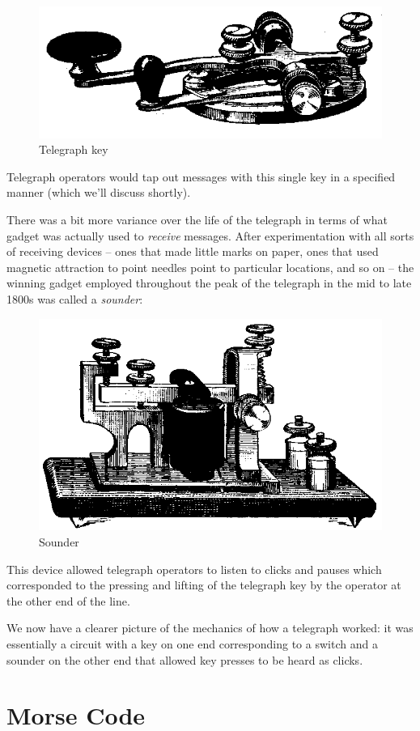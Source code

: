 \documentclass[UTF8]{book}
\begin{document}
\begin{CJK}{UTF8}{gbsn}
\begin{figure}[H]
\centering
\includegraphics[width=0.6\linewidth]{telegraphkey}
\caption{Telegraph key}
\end{figure}

Telegraph operators would tap out messages with this single key in a specified manner (which we'll discuss shortly).

There was a bit more variance over the life of the telegraph in terms of what gadget was actually used to \emph{receive} messages. After experimentation with all sorts of receiving devices -- ones that made little marks on paper, ones that used magnetic attraction to point needles point to particular locations, and so on -- the winning gadget employed throughout the peak of the telegraph in the mid to late 1800s was called a \emph{sounder}:

\begin{figure}[H]
\centering
\includegraphics[width=0.6\linewidth]{telegraphsounder}
\caption{Sounder}
\end{figure}


This device allowed telegraph operators to listen to clicks and pauses which corresponded to the pressing and lifting of the telegraph key by the operator at the other end of the line.

We now have a clearer picture of the mechanics of how a telegraph worked: it was essentially a circuit with a key on one end corresponding to a switch and a sounder on the other end that allowed key presses to be heard as clicks.

\section{Morse Code}


\end{CJK}
\end{document}
